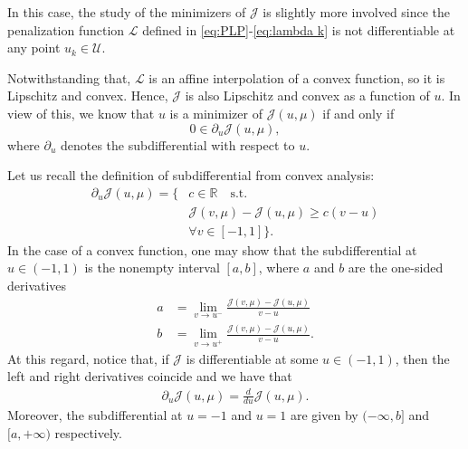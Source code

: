 \documentclass[twocolumn]{autart}    %
\begin{document}
In this case, the study of the minimizers of $\mathcal{J}$ is slightly more involved since the penalization function $\mathcal{L}$ defined in \eqref{eq:PLP}-\eqref{eq:lambda k} is not differentiable at any point $u_k\in\mathcal U$.

Notwithstanding that, $\mathcal{L}$ is an affine interpolation of a convex function, so it is Lipschitz and convex.  Hence, $\mathcal{J}$ is also Lipschitz and convex as a function of $u$. In view of this, we know that $u$ is a minimizer of $\mathcal{J} (u,\mu)$ if and only if
\begin{equation}\label{opti cond subdiff}
	0\in \partial_u \mathcal{J} (u,\mu),
\end{equation}
where $\partial_u$ denotes the subdifferential with respect to $u$. 

Let us recall the definition of subdifferential from convex analysis:
\begin{align*}
	\partial_u \mathcal{J} (u,\mu) = \{  & c\in \mathbb{R} \quad \text{s.t.} 
	\\
	&\mathcal{J} (v,\mu) - \mathcal{J} (u,\mu) \geq c(v-u) 
	\\
	& \forall v\in [-1,1] \}. 
\end{align*}
In the case of a convex function, one may show that the subdifferential at $u\in (-1,1)$ is the nonempty interval $[a,b]$, where $a$ and $b$ are the one-sided derivatives
\begin{align*}
	a &= \lim_{v\to u^-} \frac{\mathcal{J} (v,\mu) - \mathcal{J}(u,\mu)}{v-u} 
	\\[5pt]
	b &= \lim_{v\to u^+} \frac{\mathcal{J} (v,\mu) - \mathcal{J}(u,\mu)}{v-u}. 
\end{align*}
At this regard, notice that, if $\mathcal J$ is differentiable at some $u\in (-1,1)$, then the left and right derivatives coincide and we have that
\begin{align*}
	\partial_u \mathcal J(u,\mu) = \frac{d}{du} \mathcal J(u,\mu).
\end{align*}
Moreover, the subdifferential at $u=-1$ and $u=1$ are given by $(-\infty, b]$ and $[a,+\infty)$ respectively.
\end{document}
